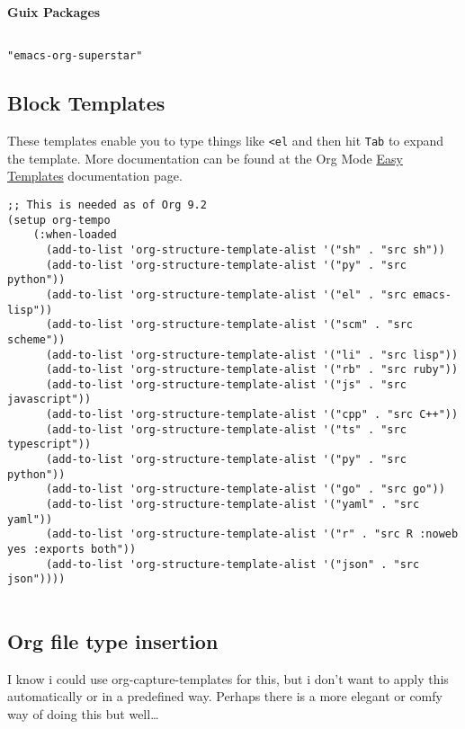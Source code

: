 \documentclass[11pt]{article}
\begin{document}
\textbf{Guix Packages}

\begin{verbatim}

"emacs-org-superstar"

\end{verbatim}
\subsection{Block Templates}
\label{sec:orgc857590}

These templates enable you to type things like \texttt{<el} and then hit \texttt{Tab} to expand
the template.  More documentation can be found at the Org Mode \href{https://orgmode.org/manual/Easy-templates.html}{Easy Templates}
documentation page.

\begin{verbatim}
;; This is needed as of Org 9.2
(setup org-tempo
    (:when-loaded
      (add-to-list 'org-structure-template-alist '("sh" . "src sh"))
      (add-to-list 'org-structure-template-alist '("py" . "src python"))
      (add-to-list 'org-structure-template-alist '("el" . "src emacs-lisp"))
      (add-to-list 'org-structure-template-alist '("scm" . "src scheme"))
      (add-to-list 'org-structure-template-alist '("li" . "src lisp"))
      (add-to-list 'org-structure-template-alist '("rb" . "src ruby"))
      (add-to-list 'org-structure-template-alist '("js" . "src javascript"))
      (add-to-list 'org-structure-template-alist '("cpp" . "src C++"))
      (add-to-list 'org-structure-template-alist '("ts" . "src typescript"))
      (add-to-list 'org-structure-template-alist '("py" . "src python"))
      (add-to-list 'org-structure-template-alist '("go" . "src go"))
      (add-to-list 'org-structure-template-alist '("yaml" . "src yaml"))
      (add-to-list 'org-structure-template-alist '("r" . "src R :noweb yes :exports both"))
      (add-to-list 'org-structure-template-alist '("json" . "src json"))))


\end{verbatim}
\subsection{Org file type insertion}
\label{sec:orge653f19}
I know i could use org-capture-templates for this, but i don't want to apply
this automatically or in a predefined way. Perhaps there is a more elegant or
comfy way of doing this but well\ldots{}
\end{document}

